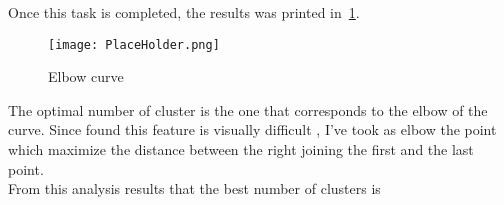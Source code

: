 \documentclass{standalone}
\begin{document}
	Once this task is completed, the results was printed in \figurename\,\ref{fig:ElbowCurve}. 
	
	\begin{figure}[h!]
		\centering
		\texttt{[image: PlaceHolder.png]}
		\label{fig:ElbowCurve}\caption{Elbow curve}
	\end{figure}

	The optimal number of cluster is the one that corresponds to the elbow of the curve. Since found this feature is visually difficult , I've took as elbow the point which maximize the distance between the right joining the first and the last point.\\
	
	From this analysis results that the best number of clusters is 
	
	
\end{document}
